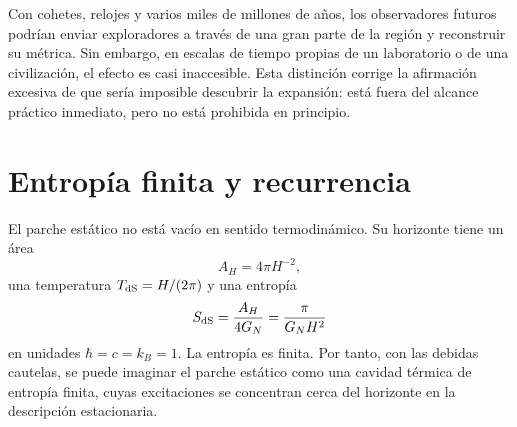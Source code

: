 Con cohetes, relojes y varios miles de millones de años, los observadores futuros podrían enviar exploradores a través de una gran parte de la región y reconstruir su métrica. Sin embargo, en escalas de tiempo propias de un laboratorio o de una civilización, el efecto es casi inaccesible. Esta distinción corrige la afirmación excesiva de que sería imposible descubrir la expansión: está fuera del alcance práctico inmediato, pero no está prohibida en principio.

\begin{classroomqa}
\end{classroomqa}

\begin{classroomqa}
\end{classroomqa}

\section{Entropía finita y recurrencia}

El parche estático no está vacío en sentido termodinámico. Su horizonte tiene un área
\begin{equation}
A_H=4\pi H^{-2},
\end{equation}
una temperatura \(T_{\rm dS}=H/(2\pi)\) y una entropía
\begin{equation}
S_{\rm dS}=\frac{A_H}{4G_N}
=\frac{\pi}{G_NH^2}
\label{eq:l09-de-sitter-entropy}
\end{equation}
en unidades \(\hbar=c=k_B=1\). La entropía es finita. Por tanto, con las debidas cautelas, se puede imaginar el parche estático como una cavidad térmica de entropía finita, cuyas excitaciones se concentran cerca del horizonte en la descripción estacionaria.

